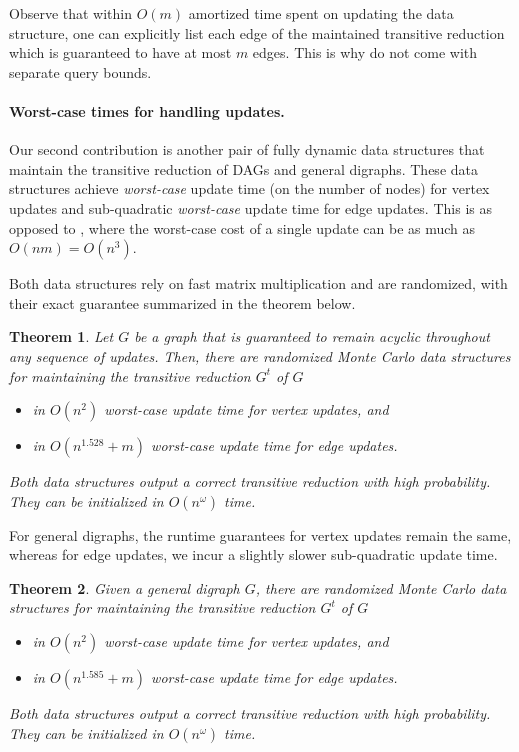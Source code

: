 \documentclass[11pt]{article}
\newtheorem{theorem}{Theorem}[section]
\begin{document}
Observe that within $O(m)$ amortized time spent on updating the data structure, one can explicitly list each edge of the maintained transitive reduction which is guaranteed to have at most $m$ edges. This is why  do not come with separate query bounds.

\paragraph*{Worst-case times for handling updates.}  

Our second contribution is another pair of fully dynamic data structures that maintain the transitive reduction of DAGs and general digraphs. These data structures achieve \emph{worst-case} update time (on the number of nodes) for vertex updates and sub-quadratic \emph{worst-case} update time for edge updates. This is as opposed to , where the worst-case cost of a single update can be as much as $O(nm) = O(n^3)$. 

Both data structures rely on fast matrix multiplication and are randomized, with their exact guarantee summarized in the theorem below.

\begin{theorem} \label{thm: ourResultsAlgebraic1}
Let $G$ be a graph that is guaranteed to remain acyclic throughout any sequence of updates. Then, there are randomized Monte Carlo data structures for maintaining the transitive reduction $G^t$ of $G$
\begin{itemize}
    \item[(1)] in $O(n^2)$ worst-case update time for vertex updates, and
    \item[(2)] in $O(n^{1.528} + m)$ worst-case update time for edge updates.
\end{itemize}
Both data structures output a correct transitive reduction with high probability. They can be initialized in $O(n^\omega)$ time. \end{theorem}

For general digraphs, the runtime guarantees for vertex updates remain the same, whereas for edge updates, we incur a slightly slower sub-quadratic update time.

\begin{theorem} \label{thm: ourResultsAlgebraic2}
Given a general digraph $G$, there are randomized Monte Carlo data structures for maintaining the transitive reduction $G^t$ of $G$
\begin{itemize}
    \item[(1)] in $O(n^2)$ worst-case update time for vertex updates, and
    \item[(2)] in $O(n^{1.585} + m)$ worst-case update time for edge updates.
\end{itemize}
Both data structures output a correct transitive reduction with high probability. They can be initialized in $O(n^\omega)$ time. \end{theorem}
\end{document}
